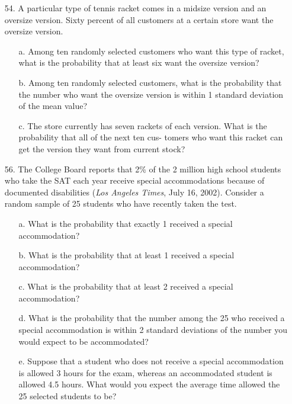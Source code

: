 \documentclass[letterpaper,12pt]{article}
\begin{document}
\begin{enumerate}
\begin{enumerate}
    \end{enumerate}
  \item[54.]
    A particular type of tennis racket comes in a midsize version and an oversize version. Sixty percent of all customers at a certain store want the oversize version.
    \begin{enumerate}
      \item[a.]
        Among ten randomly selected customers who want this type of racket, what is the probability that at least six want the oversize version?
      \item[b.]
        Among ten randomly selected customers, what is the probability that the number who want the oversize version is within 1 standard deviation of the mean value?
      \item[c.]
        The store currently has seven rackets of each version. What is the probability that all of the next ten cus- tomers who want this racket can get the version they want from current stock?
    \end{enumerate}
  \item[56.]
    The College Board reports that 2\% of the 2 million high school students who take the SAT each year receive special accommodations because of documented disabilities (\textit{Los Angeles Times}, July 16, 2002). Consider a random sample of 25 students who have recently taken the test.
    \begin{enumerate}
      \item[a.]
        What is the probability that exactly 1 received a special accommodation?
      \item[b.]
        What is the probability that at least 1 received a special accommodation?
      \item[c.]
        What is the probability that at least 2 received a special accommodation?
      \item[d.]
        What is the probability that the number among the 25 who received a special accommodation is within 2 standard deviations of the number you would expect to be accommodated?
      \item[e.]
        Suppose that a student who does not receive a special accommodation is allowed 3 hours for the exam, whereas an accommodated student is allowed 4.5 hours. What would you expect the average time allowed the 25 selected students to be?
    \end{enumerate}
\end{enumerate}
\end{document}
